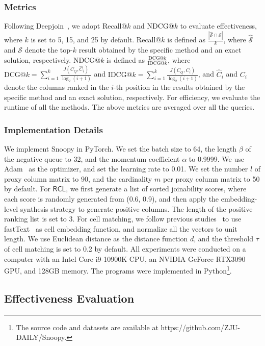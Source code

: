 \subsubsection{Metrics} Following Deepjoin~\cite{Deepjoin}, we adopt Recall@$k$ and NDCG@$k$ to evaluate effectiveness, where $k$ is set to 5, 15, and 25 by default. Recall@$k$ is defined as $\frac{|\hat{\mathcal{S}} \cap \mathcal{S}|}{k}$, where $\hat{\mathcal{S}}$ and  $\mathcal{S}$ denote the top-$k$ result obtained by the specific method and an exact solution, respectively.
NDCG@$k$ is defined as  $\frac{\text{DCG@}k}{\text{IDCG@}k}$,
where $\text{DCG@}k=\sum_{i=1}^k \frac{J(C_Q, \hat{C}_i)}{\operatorname{log}_2(i+1)}$ and $\text{IDCG@}k=\sum_{i=1}^k \frac{J(C_Q, {C}_i)}{\operatorname{log}_2(i+1)}$, and $\hat{C}_i$ and $C_i$ denote the columns ranked in the $i$-th position in the results obtained by the specific method and an exact solution, respectively. For efficiency, we evaluate the runtime of all the methods. The above metrics are averaged over all the queries.


\subsubsection{Implementation Details} We implement \textsf{Snoopy} in PyTorch. We set the batch size to 64, the length $\beta$ of the negative queue to 32, and the momentum coefficient $\alpha$  to 0.9999. We use Adam~\cite{adam} as the optimizer, and set the learning rate to 0.01. We set the number $l$ of proxy column matrix to 90, and the cardinality $m$ per proxy column matrix to 50 by default.  For $\textsf{RCL}$, we first generate
a list of sorted joinability scores, where each score is randomly generated from (0.6, 0.9), and then apply the embedding-level synthesis strategy to generate positive columns. The length of the positive ranking list is set to 3. For cell matching, we follow previous studies~\cite{Deepjoin,Pexeso} to use fastText~\cite{fasttext} as  cell embedding function, and normalize all the vectors to unit length. 
We use Euclidean distance as the distance function $d$, and the threshold $\tau$ of cell matching is set to 0.2 by default. All experiments were conducted on a computer with an Intel Core i9-10900K CPU, an NVIDIA GeForce RTX3090 GPU, and 128GB memory.  The programs were implemented in Python\footnote{
The source code and datasets are available at 
https://github.com/ZJU-DAILY/Snoopy.}.




\subsection{Effectiveness Evaluation}
\label{sec:exp_effectiveness}

